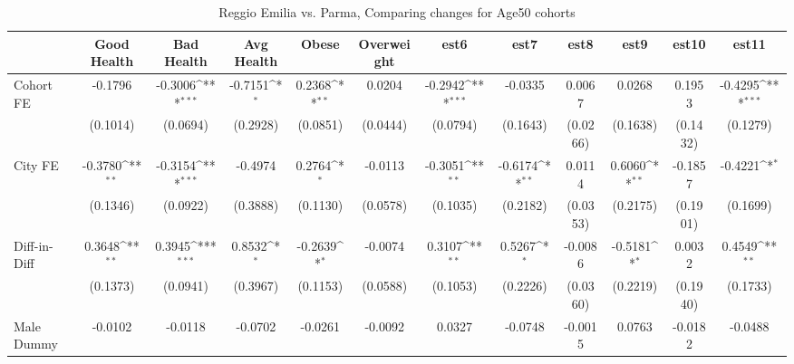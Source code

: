 \begin{table}[htbp]\centering
\def\sym#1{\ifmmode^{#1}\else\(^{#1}\)\fi}
\caption{Reggio Emilia vs. Parma, Comparing changes for Age50 cohorts}
\begin{tabular}{l*{11}{c}}
\toprule
            &\multicolumn{1}{c}{Good Health}&\multicolumn{1}{c}{Bad Health}&\multicolumn{1}{c}{Avg Health}&\multicolumn{1}{c}{Obese}&\multicolumn{1}{c}{Overweight}&\multicolumn{1}{c}{est6}&\multicolumn{1}{c}{est7}&\multicolumn{1}{c}{est8}&\multicolumn{1}{c}{est9}&\multicolumn{1}{c}{est10}&\multicolumn{1}{c}{est11}\\
\midrule
Cohort FE   &     -0.1796         &     -0.3006\sym{***}&     -0.7151\sym{*}  &      0.2368\sym{**} &      0.0204         &     -0.2942\sym{***}&     -0.0335         &      0.0067         &      0.0268         &      0.1953         &     -0.4295\sym{***}\\
            &    (0.1014)         &    (0.0694)         &    (0.2928)         &    (0.0851)         &    (0.0444)         &    (0.0794)         &    (0.1643)         &    (0.0266)         &    (0.1638)         &    (0.1432)         &    (0.1279)         \\
\addlinespace
City FE     &     -0.3780\sym{**} &     -0.3154\sym{***}&     -0.4974         &      0.2764\sym{*}  &     -0.0113         &     -0.3051\sym{**} &     -0.6174\sym{**} &      0.0114         &      0.6060\sym{**} &     -0.1857         &     -0.4221\sym{*}  \\
            &    (0.1346)         &    (0.0922)         &    (0.3888)         &    (0.1130)         &    (0.0578)         &    (0.1035)         &    (0.2182)         &    (0.0353)         &    (0.2175)         &    (0.1901)         &    (0.1699)         \\
\addlinespace
Diff-in-Diff&      0.3648\sym{**} &      0.3945\sym{***}&      0.8532\sym{*}  &     -0.2639\sym{*}  &     -0.0074         &      0.3107\sym{**} &      0.5267\sym{*}  &     -0.0086         &     -0.5181\sym{*}  &      0.0032         &      0.4549\sym{**} \\
            &    (0.1373)         &    (0.0941)         &    (0.3967)         &    (0.1153)         &    (0.0588)         &    (0.1053)         &    (0.2226)         &    (0.0360)         &    (0.2219)         &    (0.1940)         &    (0.1733)         \\
\addlinespace
Male Dummy  &     -0.0102         &     -0.0118         &     -0.0702         &     -0.0261         &     -0.0092         &      0.0327         &     -0.0748         &     -0.0015         &      0.0763         &     -0.0182         &     -0.0488         \\

\end{tabular}
\end{table}
